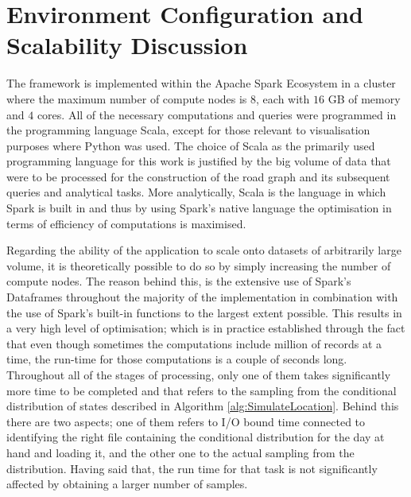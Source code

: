\documentclass[12pt]{article}
\theoremstyle{definition}
\begin{document}
\section{Environment Configuration and Scalability Discussion}
The framework is implemented within the Apache Spark Ecosystem in a cluster where the maximum number of compute nodes is $8$, each with $16$ GB of memory and $4$ cores. All of the necessary computations and queries were programmed in the programming language Scala, except for those relevant to visualisation purposes where Python was used. The choice of Scala as the primarily used programming language for this work is justified by the big volume of data that were to be processed for the construction of the road graph and its subsequent queries and analytical tasks. More analytically, Scala is the language in which Spark is built in and thus by using Spark's native language the optimisation in terms of efficiency of computations is maximised. 

Regarding the ability of the application to scale onto datasets of arbitrarily large volume, it is theoretically possible to do so by simply increasing the number of compute nodes. The reason behind this, is the extensive use of Spark's Dataframes throughout the majority of the implementation in combination with the use of Spark's built-in functions to the largest extent possible. This results in a very high level of optimisation; which is in practice established through the fact that even though sometimes the computations include million of records at a time, the run-time for those computations is a couple of seconds long. Throughout all of the stages of processing, only one of them takes significantly more time to be completed and that refers to the sampling from the conditional distribution of states described in Algorithm \ref{alg:SimulateLocation}. Behind this there are two aspects; one of them refers to I/O bound time connected to identifying the right file containing the conditional distribution for the day at hand and loading it, and the other one to the actual sampling from the distribution. Having said that, the run time for that task is not significantly affected by obtaining a larger number of samples. 
\end{document}
